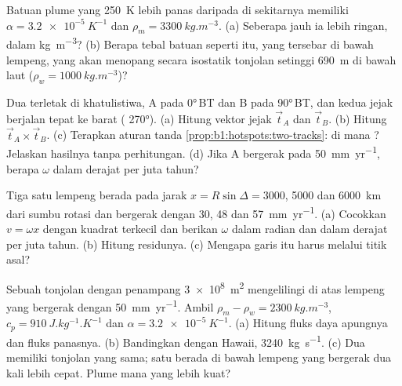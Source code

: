 \begin{exercise}[$\star$]\label{exo:b1:hotspots:4}
Batuan plume yang \qty{250}{K} lebih panas daripada  di sekitarnya memiliki $\alpha = \qty{3.2e-5}{K^{-1}}$ dan $\rho_m = \qty{3300}{kg.m^{-3}}$. (a) Seberapa jauh ia lebih ringan, dalam \unit{kg.m^{-3}}? (b) Berapa tebal batuan seperti itu, yang tersebar di bawah lempeng, yang akan menopang secara isostatik tonjolan setinggi \qty{690}{m} di bawah laut ($\rho_w = \qty{1000}{kg.m^{-3}}$)?
\end{exercise}

\begin{exercise}[$\star\star$]\label{exo:b1:hotspots:5}
Dua  terletak di khatulistiwa, A pada \ang{0}\,BT dan B pada \ang{90}\,BT, dan kedua jejak berjalan tepat ke barat ( \ang{270}). (a) Hitung vektor jejak $\vec t_A$ dan $\vec t_B$. (b) Hitung $\vec t_A\times\vec t_B$. (c) Terapkan aturan tanda \cref{prop:b1:hotspots:two-tracks}: di mana ? Jelaskan hasilnya tanpa perhitungan. (d) Jika A bergerak pada \qty{50}{mm.yr^{-1}}, berapa $\omega$ dalam derajat per juta tahun?
\end{exercise}

\begin{exercise}[$\star\star$]\label{exo:b1:hotspots:6}
Tiga  satu lempeng berada pada jarak $x = R\sin\Delta = 3000$, 5000 dan \qty{6000}{km} dari sumbu rotasi dan bergerak dengan 30, 48 dan \qty{57}{mm.yr^{-1}}. (a) Cocokkan $v = \omega x$ dengan kuadrat terkecil dan berikan $\omega$ dalam radian dan dalam derajat per juta tahun. (b) Hitung residunya. (c) Mengapa garis itu harus melalui titik asal?
\end{exercise}

\begin{exercise}[$\star\star$]\label{exo:b1:hotspots:7}
Sebuah tonjolan dengan penampang \qty{3e8}{m^2} mengelilingi  di atas lempeng yang bergerak dengan \qty{50}{mm.yr^{-1}}. Ambil $\rho_m - \rho_w = \qty{2300}{kg.m^{-3}}$, $c_p = \qty{910}{J.kg^{-1}.K^{-1}}$ dan $\alpha = \qty{3.2e-5}{K^{-1}}$. (a) Hitung fluks daya apungnya dan fluks panasnya. (b) Bandingkan dengan Hawaii, \qty{3240}{kg.s^{-1}}. (c) Dua  memiliki tonjolan yang sama; satu berada di bawah lempeng yang bergerak dua kali lebih cepat. Plume mana yang lebih kuat?
\end{exercise}

